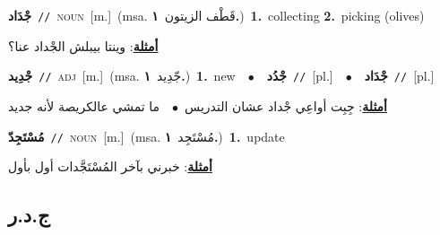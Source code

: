 \documentclass[10pt,a4paper,twoside]{article} %
\begin{document}
\begin{multicols}{2}
{{{{{{{{{{{{\setlength\topsep{0pt}\textbf{\foreignlanguage{arabic}{جْدَاد}}\ {\color{gray}\texttt{//}\color{black}}\ \textsc{noun}\ [m.]\ \color{gray}(msa. \foreignlanguage{arabic}{قَطْف الزيتون}~\foreignlanguage{arabic}{\textbf{١.}})\color{black}\ \textbf{1.}~collecting  \textbf{2.}~picking (olives)\  \begin{flushright}\color{gray}\foreignlanguage{arabic}{\textbf{\underline{\foreignlanguage{arabic}{أمثلة}}}: وينتا بيبلش الجْداد عنا؟}\end{flushright}\color{black}} \vspace{2mm}

{\setlength\topsep{0pt}\textbf{\foreignlanguage{arabic}{جْدِيد}}\ {\color{gray}\texttt{//}\color{black}}\ \textsc{adj}\ [m.]\ \color{gray}(msa. \foreignlanguage{arabic}{جّدِيد}~\foreignlanguage{arabic}{\textbf{١.}})\color{black}\ \textbf{1.}~new\ \ $\bullet$\ \ \setlength\topsep{0pt}\textbf{\foreignlanguage{arabic}{جْدُد}}\ {\color{gray}\texttt{//}\color{black}}\ [pl.]\ \ $\bullet$\ \ \setlength\topsep{0pt}\textbf{\foreignlanguage{arabic}{جْدَاد}}\ {\color{gray}\texttt{//}\color{black}}\ [pl.]\  \begin{flushright}\color{gray}\foreignlanguage{arabic}{\textbf{\underline{\foreignlanguage{arabic}{أمثلة}}}: جِبِت أواعِي جْداد عشان التدريس\ $\bullet$\ \  ما تمشي عالكريصة لأنه جديد}\end{flushright}\color{black}} \vspace{2mm}

{\setlength\topsep{0pt}\textbf{\foreignlanguage{arabic}{مُسْتَجِدّ}}\ {\color{gray}\texttt{//}\color{black}}\ \textsc{noun}\ [m.]\ \color{gray}(msa. \foreignlanguage{arabic}{مُسْتَجِد}~\foreignlanguage{arabic}{\textbf{١.}})\color{black}\ \textbf{1.}~update\  \begin{flushright}\color{gray}\foreignlanguage{arabic}{\textbf{\underline{\foreignlanguage{arabic}{أمثلة}}}: خبرني بآخر المُسْتَجَّدات أول بأول}\end{flushright}\color{black}} \vspace{2mm}

\vspace{-3mm}
\subsection*{\color{blue}\foreignlanguage{arabic}{ج.د.ر}\color{blue}{}} 

}}}}}}}}}}}
\end{multicols}
\end{document}
